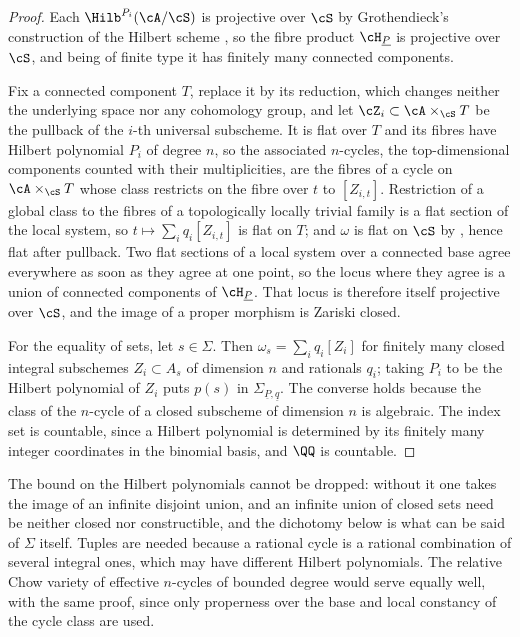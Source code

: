 \begin{proof}
Each $\Hilb^{P_{i}}(\cA/\cS)$ is projective over $\cS$ by Grothendieck's
construction of the Hilbert scheme \cite{Gro61}, so the fibre product
$\cH_{\underline{P}}$ is
projective over $\cS$, and being of finite type it has finitely many connected
components.

Fix a connected component $T$, replace it by its reduction, which changes
neither the underlying space nor any cohomology group, and let
$\cZ_{i}\subset\cA\times_{\cS}T$ be the pullback of the $i$-th universal
subscheme. It is flat over $T$ and its fibres have Hilbert polynomial $P_{i}$
of degree $n$, so the associated $n$-cycles, the top-dimensional components
counted with their multiplicities, are the fibres of a cycle on
$\cA\times_{\cS}T$ whose class restricts on the fibre over $t$ to $[Z_{i,t}]$.
Restriction of a global class to the fibres of a topologically
locally trivial family is a flat section of the local system, so
$t\mapsto\sum_{i}q_{i}[Z_{i,t}]$ is flat on $T$; and $\omega$ is flat on $\cS$
by , hence flat after pullback. Two flat sections of a
local system over a connected base agree everywhere as soon as they agree at
one point, so the locus where they agree is a union of connected components of
$\cH_{\underline{P}}$. That locus is therefore itself projective over $\cS$,
and the image of a proper morphism is Zariski closed.

For the equality of sets, let $s\in\Sigma$. Then
$\omega_{s}=\sum_{i}q_{i}[Z_{i}]$ for finitely many closed integral subschemes
$Z_{i}\subset A_{s}$ of dimension $n$ and rationals $q_{i}$; taking
$P_{i}$ to be the Hilbert polynomial of $Z_{i}$ puts $p(s)$ in
$\Sigma_{\underline{P},\underline{q}}$. The converse holds because the class
of the $n$-cycle of a closed subscheme of dimension $n$ is algebraic. The
index set is countable, since a Hilbert polynomial is determined by its
finitely many integer coordinates in the binomial basis, and $\QQ$ is
countable.
\end{proof}

The bound on the Hilbert polynomials cannot be dropped: without it one takes
the image of an infinite disjoint union, and an infinite union of closed sets
need be neither closed nor constructible, and the dichotomy below is what
can be said of $\Sigma$ itself. Tuples are needed because a rational cycle is a rational combination
of several integral ones, which may have different Hilbert polynomials. The
relative Chow variety of effective $n$-cycles of bounded degree would serve
equally well, with the same proof, since only properness over the base and
local constancy of the cycle class are used.


